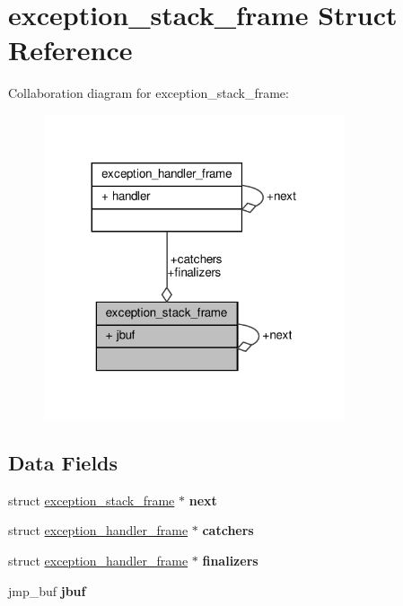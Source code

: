 \hypertarget{structexception__stack__frame}{}\section{exception\+\_\+stack\+\_\+frame Struct Reference}
\label{structexception__stack__frame}


Collaboration diagram for exception\+\_\+stack\+\_\+frame\+:\nopagebreak
\begin{figure}[H]
\begin{center}
\leavevmode
\includegraphics[width=251pt]{structexception__stack__frame__coll__graph}
\end{center}
\end{figure}
\subsection*{Data Fields}
\begin{DoxyCompactItemize}
\item 
\mbox{\label{structexception__stack__frame_abb538d9a6f6155ed83f140dd2adb7457}} 
struct \hyperlink{structexception__stack__frame}{exception\+\_\+stack\+\_\+frame} $\ast$ {\bfseries next}
\item 
\mbox{\label{structexception__stack__frame_a950ab78cc930f9662ff9cb7eedcfda79}} 
struct \hyperlink{structexception__handler__frame}{exception\+\_\+handler\+\_\+frame} $\ast$ {\bfseries catchers}
\item 
\mbox{\label{structexception__stack__frame_a543e62e78b4b2777e9df32ccc5feba38}} 
struct \hyperlink{structexception__handler__frame}{exception\+\_\+handler\+\_\+frame} $\ast$ {\bfseries finalizers}
\item 
\mbox{\label{structexception__stack__frame_a6f81386a697bcae78000625ee8ba02fa}} 
jmp\+\_\+buf {\bfseries jbuf}
\end{DoxyCompactItemize}


